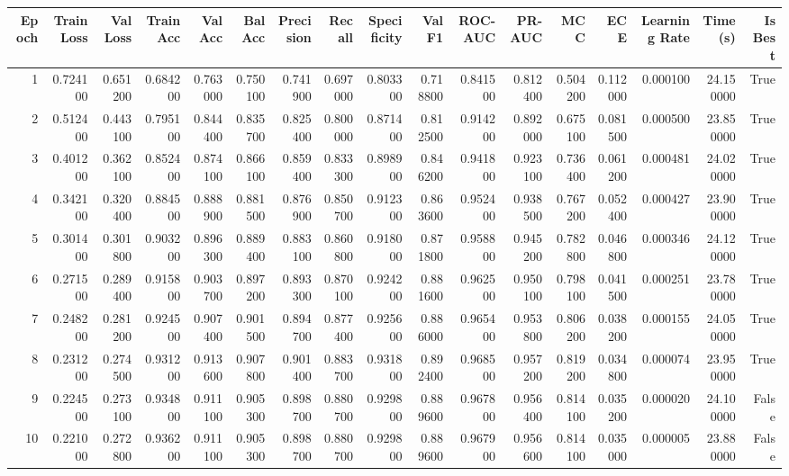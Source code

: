 \begin{tabular}{rrrrrrrrrrrrrrrrr}
\toprule
Epoch & Train Loss & Val Loss & Train Acc & Val Acc & Bal Acc & Precision & Recall & Specificity & Val F1 & ROC-AUC & PR-AUC & MCC & ECE & Learning Rate & Time (s) & Is Best \\
\midrule
1 & 0.724100 & 0.651200 & 0.684200 & 0.763000 & 0.750100 & 0.741900 & 0.697000 & 0.803300 & 0.718800 & 0.841500 & 0.812400 & 0.504200 & 0.112000 & 0.000100 & 24.150000 & True \\
2 & 0.512400 & 0.443100 & 0.795100 & 0.844400 & 0.835700 & 0.825400 & 0.800000 & 0.871400 & 0.812500 & 0.914200 & 0.892000 & 0.675100 & 0.081500 & 0.000500 & 23.850000 & True \\
3 & 0.401200 & 0.362100 & 0.852400 & 0.874100 & 0.866100 & 0.859400 & 0.833300 & 0.898900 & 0.846200 & 0.941800 & 0.923100 & 0.736400 & 0.061200 & 0.000481 & 24.020000 & True \\
4 & 0.342100 & 0.320400 & 0.884500 & 0.888900 & 0.881500 & 0.876900 & 0.850700 & 0.912300 & 0.863600 & 0.952400 & 0.938500 & 0.767200 & 0.052400 & 0.000427 & 23.900000 & True \\
5 & 0.301400 & 0.301800 & 0.903200 & 0.896300 & 0.889400 & 0.883100 & 0.860800 & 0.918000 & 0.871800 & 0.958800 & 0.945200 & 0.782800 & 0.046800 & 0.000346 & 24.120000 & True \\
6 & 0.271500 & 0.289400 & 0.915800 & 0.903700 & 0.897200 & 0.893300 & 0.870100 & 0.924200 & 0.881600 & 0.962500 & 0.950100 & 0.798100 & 0.041500 & 0.000251 & 23.780000 & True \\
7 & 0.248200 & 0.281200 & 0.924500 & 0.907400 & 0.901500 & 0.894700 & 0.877400 & 0.925600 & 0.886000 & 0.965400 & 0.953800 & 0.806200 & 0.038200 & 0.000155 & 24.050000 & True \\
8 & 0.231200 & 0.274500 & 0.931200 & 0.913600 & 0.907800 & 0.901400 & 0.883700 & 0.931800 & 0.892400 & 0.968500 & 0.957200 & 0.819200 & 0.034800 & 0.000074 & 23.950000 & True \\
9 & 0.224500 & 0.273100 & 0.934800 & 0.911100 & 0.905300 & 0.898700 & 0.880700 & 0.929800 & 0.889600 & 0.967800 & 0.956400 & 0.814100 & 0.035200 & 0.000020 & 24.100000 & False \\
10 & 0.221000 & 0.272800 & 0.936200 & 0.911100 & 0.905300 & 0.898700 & 0.880700 & 0.929800 & 0.889600 & 0.967900 & 0.956600 & 0.814100 & 0.035000 & 0.000005 & 23.880000 & False \\
\bottomrule
\end{tabular}
